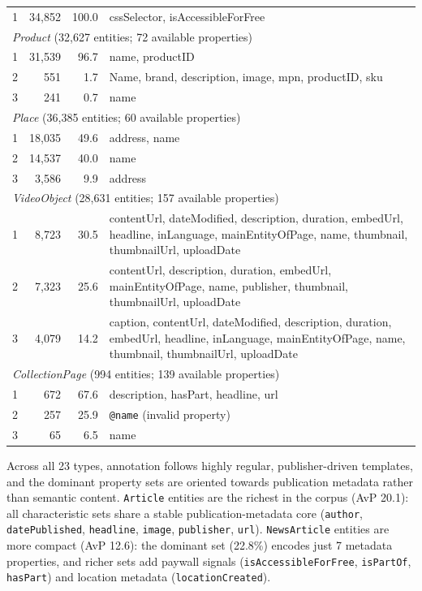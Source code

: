 \documentclass[11pt,a4paper]{article}
\begin{document}
\begin{longtable}{rrrp{9cm}}
\midrule
1 &  34{,}852 & 100.0 & \scriptsize cssSelector, isAccessibleForFree \\[4pt]
%
\multicolumn{4}{l}{\textit{Product} (32{,}627 entities; 72 available properties)} \\
\midrule
1 &  31{,}539 & 96.7 & \scriptsize name, productID \\[2pt]
2 &       551 &  1.7 & \scriptsize Name, brand, description, image, mpn, productID, sku \\[2pt]
3 &       241 &  0.7 & \scriptsize name \\[4pt]
%
\multicolumn{4}{l}{\textit{Place} (36{,}385 entities; 60 available properties)} \\
\midrule
1 &  18{,}035 & 49.6 & \scriptsize address, name \\[2pt]
2 &  14{,}537 & 40.0 & \scriptsize name \\[2pt]
3 &   3{,}586 &  9.9 & \scriptsize address \\[4pt]
%
\multicolumn{4}{l}{\textit{VideoObject} (28{,}631 entities; 157 available properties)} \\
\midrule
1 &   8{,}723 & 30.5 & \scriptsize contentUrl, dateModified, description, duration, embedUrl, headline, inLanguage, mainEntityOfPage, name, thumbnail, thumbnailUrl, uploadDate \\[2pt]
2 &   7{,}323 & 25.6 & \scriptsize contentUrl, description, duration, embedUrl, mainEntityOfPage, name, publisher, thumbnail, thumbnailUrl, uploadDate \\[2pt]
3 &   4{,}079 & 14.2 & \scriptsize caption, contentUrl, dateModified, description, duration, embedUrl, headline, inLanguage, mainEntityOfPage, name, thumbnail, thumbnailUrl, uploadDate \\[4pt]
%
\multicolumn{4}{l}{\textit{CollectionPage} (994 entities; 139 available properties)} \\
\midrule
1 &       672 & 67.6 & \scriptsize description, hasPart, headline, url \\[2pt]
2 &       257 & 25.9 & \scriptsize \texttt{@name} (invalid property) \\[2pt]
3 &        65 &  6.5 & \scriptsize name \\
\end{longtable}
\setlength{\tabcolsep}{6pt}

\noindent
Across all 23 types, annotation follows highly regular, publisher-driven
templates, and the dominant property sets are oriented towards publication
metadata rather than semantic content.
\texttt{Article} entities are the richest in the corpus (AvP 20.1): all
characteristic sets share a stable publication-metadata core
(\texttt{author}, \texttt{datePublished}, \texttt{headline}, \texttt{image},
\texttt{publisher}, \texttt{url}).
\texttt{NewsArticle} entities are more compact (AvP 12.6): the dominant set
(22.8\%) encodes just 7 metadata properties, and richer sets add paywall
signals (\texttt{isAccessibleForFree}, \texttt{isPartOf}, \texttt{hasPart})
and location metadata (\texttt{locationCreated}).
\end{document}
